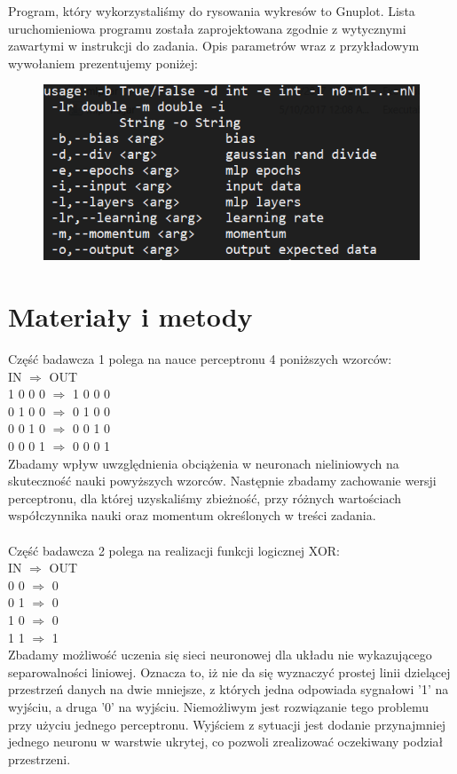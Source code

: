\documentclass{classrep}
\begin{document}
{\begin{itemize}
Program, który wykorzystaliśmy do rysowania wykresów to Gnuplot.
Lista uruchomieniowa programu została zaprojektowana zgodnie z wytycznymi zawartymi w instrukcji do zadania. Opis parametrów wraz z przykładowym wywołaniem prezentujemy poniżej:

\begin{figure}[h!]
\centering
 \includegraphics{img/arg.png}
 \vspace{-0.3cm}
\end{figure}

\end{itemize}
\newpage
\section{Materiały i metody}
Część badawcza 1 polega na nauce perceptronu 4 poniższych wzorców: \\
IN  $\Rightarrow$ OUT \\
1 0 0 0 $\Rightarrow$ 1 0 0 0 \\
0 1 0 0 $\Rightarrow$ 0 1 0 0 \\
0 0 1 0 $\Rightarrow$ 0 0 1 0 \\
0 0 0 1 $\Rightarrow$ 0 0 0 1 \\
Zbadamy wpływ uwzględnienia obciążenia w neuronach nieliniowych na skuteczność nauki powyższych wzorców. Następnie zbadamy zachowanie wersji perceptronu, dla której uzyskaliśmy zbieżność,  przy różnych wartościach współczynnika nauki oraz momentum określonych w treści zadania.\\
\\
Część badawcza 2 polega na realizacji funkcji logicznej XOR: \\
IN  $\Rightarrow$ OUT \\
0 0 $\Rightarrow$ 0 \\
0 1 $\Rightarrow$ 0 \\
1 0 $\Rightarrow$ 0 \\
1 1 $\Rightarrow$ 1 \\
Zbadamy możliwość uczenia się sieci neuronowej dla układu nie wykazującego separowalności liniowej. Oznacza to, iż nie da się wyznaczyć prostej linii dzielącej przestrzeń danych na dwie mniejsze, z których jedna odpowiada sygnałowi '1' na wyjściu, a druga '0' na wyjściu. Niemożliwym jest rozwiązanie tego problemu przy użyciu jednego perceptronu. Wyjściem z sytuacji jest dodanie przynajmniej jednego neuronu w warstwie ukrytej, co pozwoli zrealizować oczekiwany podział przestrzeni.

 }
\end{document}
